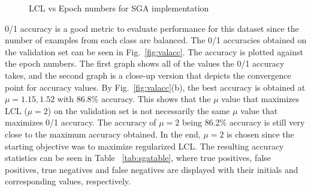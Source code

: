 \documentclass[a4paper]{article}
\begin{document}
\begin{figure}
\caption{\label{fig:lclvsep}LCL vs Epoch numbers for SGA implementation}
\end{figure}

0/1 accuracy is a good metric to evaluate performance for this dataset since the number of examples from each class are balanced. The 0/1 accuracies obtained on the validation set can be seen in Fig.~\ref{fig:valacc}. The accuracy is plotted against the epoch numbers. The first graph shows all of the values the 0/1 accuracy takes, and the second graph is a close-up version that depicts the convergence point for accuracy values. By Fig.~\ref{fig:valacc}(b), the best accuracy is obtained at $\mu = {1.15, 1.52}$ with 86.8\% accuracy. This shows that the $\mu$ value that maximizes LCL ($\mu = 2$) on the validation set is not necessarily the same $\mu$ value that maximizes 0/1 accuracy. The accuracy of $\mu = 2$ being 86.2\% accuracy is still very close to the maximum accuracy obtained. In the end, $\mu = 2$ is chosen since the starting objective was to maximize regularized LCL. The resulting accuracy statistics can be seen in Table ~\ref{tab:sgatable}, where true positives, false positives, true negatives and false negatives are displayed with their initials and corresponding values, respectively.\\
\end{document}
